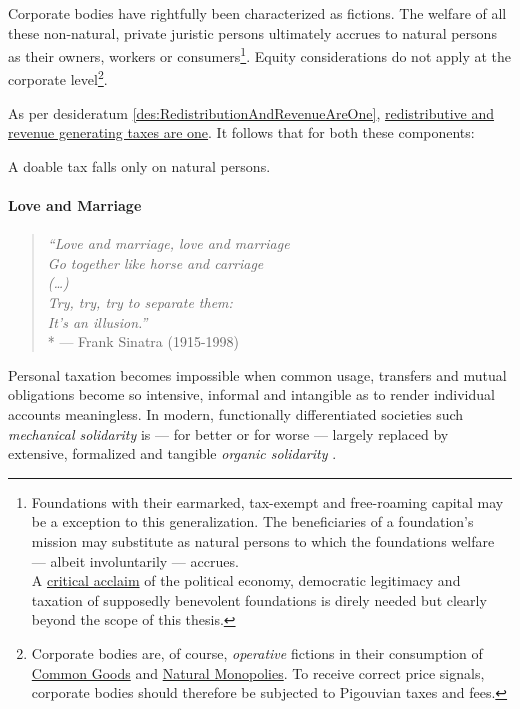 
Corporate bodies have rightfully been characterized as fictions.
 The welfare of all these non-natural, private juristic persons ultimately accrues to natural persons as their owners, workers or consumers\footnote{
	Foundations with their earmarked, tax-exempt and free-roaming capital may be a exception to this generalization.
The beneficiaries of a foundation's mission may substitute as natural persons to which the foundations welfare --- albeit involuntarily --- accrues.\\A \href{http://maxheld.de/2010/03/27/foundations-may-be-bad/}{critical acclaim} of the political economy, democratic legitimacy and taxation of supposedly benevolent foundations is direly needed but clearly beyond the scope of this thesis.}.
Equity considerations do not apply at the corporate level\footnote{
	Corporate bodies are, of course, \emph{operative} fictions in their consumption of \href{sec:CommonGood}{Common Goods} and \href{sec:NaturalMonopolies}{Natural Monopolies}.
To receive correct price signals, corporate bodies should therefore be subjected to Pigouvian taxes and fees.}.

As per desideratum \ref{des:RedistributionAndRevenueAreOne}, \hyperref[des:RedistributionAndRevenueAreOne]{redistributive and revenue generating taxes are one}.
It follows that for both these components:

\begin{desideratum}
	A doable tax falls only on natural persons.
	\label{des:PersonalTaxation}
\end{desideratum}

\paragraph{Love and Marriage}  \label{sec:love-marriage}

\begin{verse}
	\emph{``Love and marriage, love and marriage\\
	Go together like horse and carriage\\
	(\ldots)\\
	Try, try, try to separate them:\\
	It's an illusion.''}\\*
	--- Frank Sinatra (1915-1998)
\end{verse}
Personal taxation becomes impossible when common usage, transfers and mutual obligations become so intensive, informal and intangible as to render individual accounts meaningless.
In modern, functionally differentiated societies such \emph{mechanical solidarity} is --- for better or for worse --- largely replaced by extensive, formalized and tangible \emph{organic solidarity} \citep{Durkheim-1893-aa}.


